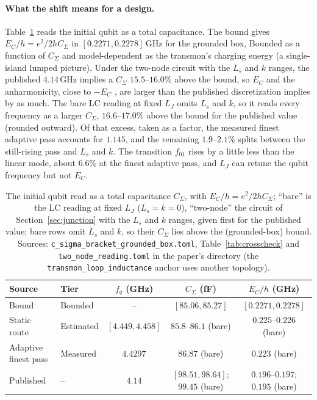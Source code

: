 \documentclass{anvil-paper}
\begin{document}
\paragraph{What the shift means for a design.}
Table~\ref{tab:design} reads the initial qubit as a total capacitance. The
bound gives $E_C/h = e^2/2hC_\Sigma$ in $[0.2271, 0.2278]$\,GHz for the
grounded box, Bounded as a function of $C_\Sigma$ and model-dependent as
the transmon's charging energy (a single-island lumped picture). Under the
two-node circuit with the $L_s$ and $k$ ranges, the published $4.14$\,GHz
implies a $C_\Sigma$ $15.5$--$16.0\%$ above the bound, so $E_C$ and the
anharmonicity, close to $-E_C$ \citep{koch2007charge}, are larger than the
published discretization implies by as much. The bare LC reading at fixed
$L_J$ omits $L_s$ and $k$, so it reads every frequency as a larger
$C_\Sigma$, $16.6$--$17.0\%$ above the bound for the published value
(rounded outward). Of that excess, taken as a factor, the measured finest adaptive pass accounts
for $1.145$, and the remaining $1.9$--$2.1\%$ splits between the still-rising pass and $L_s$ and $k$. The transition $f_{01}$ rises by a
little less than the linear mode, about $6.6\%$ at the finest adaptive pass, and
$L_J$ can retune the qubit frequency but not $E_C$.

\begin{table}[htbp]
  \centering
  \caption{The initial qubit read as a total capacitance $C_\Sigma$, with
  $E_C/h = e^2/2hC_\Sigma$; ``bare'' is the LC reading at fixed $L_J$
  ($L_s = k = 0$), ``two-node'' the circuit of
  Section~\ref{sec:junction} with the $L_s$ and $k$ ranges, given first for
  the published value; bare rows omit $L_s$ and $k$, so their $C_\Sigma$
  lies above the (grounded-box) bound. Sources:
  \texttt{c\_sigma\_bracket\_grounded\_box.toml}, Table~\ref{tab:crosscheck}
  and \texttt{two\_node\_reading.toml} in the paper's directory (the
  \texttt{transmon\_loop\_inductance} anchor uses another topology).}
  \label{tab:design}
  \footnotesize
  \begin{tabular}{@{}llccc@{}}
    \toprule
    Source & Tier & $f_q$ (GHz) & $C_\Sigma$ (fF) & $E_C/h$ (GHz) \\
    \midrule
    Bound & Bounded & -- & $[85.06, 85.27]$ & $[0.2271, 0.2278]$ \\
    Static route & Estimated & $[4.449, 4.458]$ & $85.8$--$86.1$ (bare) & $0.225$--$0.226$ (bare) \\
    Adaptive finest pass & Measured & $4.4297$ & $86.87$ (bare) & $0.223$ (bare) \\
    Published & -- & $4.14$ & $[98.51, 98.64]$; $99.45$ (bare) & $0.196$--$0.197$; $0.195$ (bare) \\
    \bottomrule
  \end{tabular}
\end{table}
\end{document}
